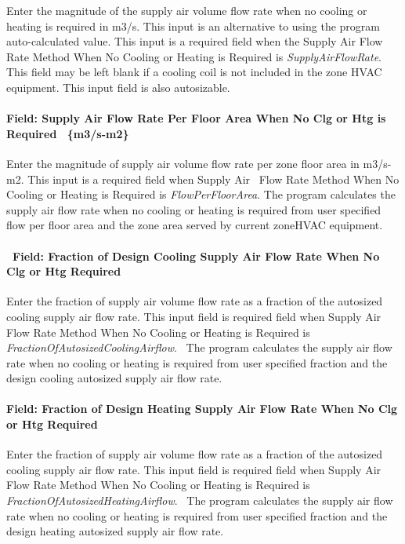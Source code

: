 Enter the magnitude of the supply air volume flow rate when no cooling or heating is required in m3/s. This input is an alternative to using the program auto-calculated value. This input is a required field when the Supply Air Flow Rate Method When No Cooling or Heating is Required is \emph{SupplyAirFlowRate}. This field may be left blank if a cooling coil is not included in the zone HVAC equipment. This input field is also autosizable.

\paragraph{Field: Supply Air Flow Rate Per Floor Area When No Clg or Htg is Required~ \{m3/s-m2\}}\label{field-supply-air-flow-rate-per-floor-area-when-no-clg-or-htg-is-required-m3s-m2}

Enter the magnitude of supply air volume flow rate per zone floor area in m3/s-m2. This input is a required field when Supply Air ~Flow Rate Method When No Cooling or Heating is Required is \emph{FlowPerFloorArea}. The program calculates the supply air flow rate when no cooling or heating is required from user specified flow per floor area and the zone area served by current zoneHVAC equipment.

\paragraph{~Field: Fraction of Design Cooling Supply Air Flow Rate When No Clg or Htg Required}\label{field-fraction-of-design-cooling-supply-air-flow-rate-when-no-clg-or-htg-required}

Enter the fraction of supply air volume flow rate as a fraction of the autosized cooling supply air flow rate. This input field is required field when Supply Air Flow Rate Method When No Cooling or Heating is Required is \emph{FractionOfAutosizedCoolingAirflow}.~ The program calculates the supply air flow rate when no cooling or heating is required from user specified fraction and the design cooling autosized supply air flow rate.

\paragraph{Field: Fraction of Design Heating Supply Air Flow Rate When No Clg or Htg Required}\label{field-fraction-of-design-heating-supply-air-flow-rate-when-no-clg-or-htg-required}

Enter the fraction of supply air volume flow rate as a fraction of the autosized cooling supply air flow rate. This input field is required field when Supply Air Flow Rate Method When No Cooling or Heating is Required is \emph{FractionOfAutosizedHeatingAirflow}.~ The program calculates the supply air flow rate when no cooling or heating is required from user specified fraction and the design heating autosized supply air flow rate.

